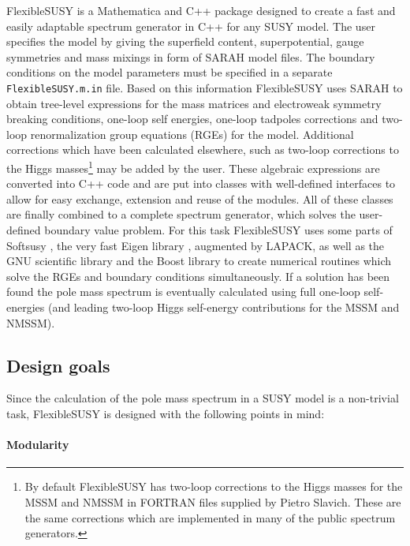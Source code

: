 \documentclass[final,3p,11pt,pdflatex]{elsarticle}
\makeatletter
\newcommand{\sarah}{SARAH\@\xspace}
\newcommand{\fs}{FlexibleSUSY\@\xspace}
\newcommand{\mathematica}{Mathematica\xspace}
\newcommand{\code}[1]{\lstinline|#1|}  %
\makeatother
\begin{document}
\fs is a \mathematica and C++ package designed to create a fast and easily
adaptable spectrum generator in C++ for any SUSY model.
The user specifies the model by giving the
superfield content, superpotential, gauge symmetries and mass mixings
in form of \sarah model files.  The boundary conditions on the model
parameters must be specified in a separate \code{FlexibleSUSY.m.in} file.
Based on this information \fs uses \sarah to obtain tree-level
expressions for the mass matrices and electroweak symmetry breaking
conditions, one-loop self energies, one-loop tadpoles corrections and
two-loop renormalization group equations (RGEs) for the model.
Additional corrections which have been calculated elsewhere, such as
two-loop corrections to the Higgs masses\footnote{By default
  \fs has two-loop corrections to the Higgs masses for the
  MSSM
  \cite{Degrassi:2001yf,Brignole:2001jy,Dedes:2002dy,Brignole:2002bz,Dedes:2003km}
  and NMSSM \cite{Degrassi:2009yq} in FORTRAN files supplied by Pietro
  Slavich. These are the same corrections which are implemented in
  many of the public spectrum generators.} may be added by the user.
%
These algebraic expressions are converted into C++ code and are put
into classes with well-defined interfaces to allow for easy exchange,
extension and reuse of the modules.  All of these classes are finally
combined to a complete spectrum generator, which solves the
user-defined boundary value problem.  For this task \fs uses some
parts of Softsusy \cite{Allanach:2001kg}, the very fast Eigen library
\cite{eigen}, augmented by LAPACK, as well as the GNU scientific
library and the Boost library to create numerical routines which solve
the RGEs and boundary conditions simultaneously.  If a solution has
been found the pole mass spectrum is eventually calculated using full
one-loop self-energies (and leading two-loop Higgs self-energy
contributions for the MSSM and NMSSM).

\subsection*{Design goals}

Since the calculation of the pole mass spectrum in a SUSY model is a
non-trivial task, \fs is designed with the following points in mind:

\paragraph{Modularity}
\end{document}
